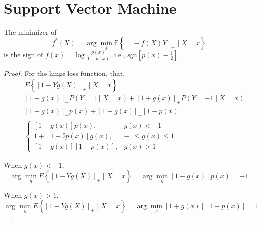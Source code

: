 \chapter{Support Vector Machine}

\begin{theorem}
    The minimizer of
    \begin{equation*}
        f^{*}(X)=\arg\min_{f}\mathbb{E}\left\{\left[1-f(X)Y\right]_{+}\mid X=x\right\}
    \end{equation*}
    is the sign of $f(x)=\log\frac{p(x)}{1-p(x)}$, i.e., $\text{sgn}\left[p(x)-\frac{1}{2}\right]$.
\end{theorem}

\begin{proof}
    For the hinge loss function, that,
    \begin{equation*}
        \begin{aligned}
              & E\left\{\left[1-Yg(X)\right]_{+}\mid X=x\right\}                                                   \\
            = & \left[1-g(x)\right]_{+}P\left(Y=1\mid X=x\right)+\left[1+g(x)\right]_{+}P\left(Y=-1\mid X=x\right) \\
            = & \left[1-g(x)\right]_{+}p(x)+\left[1+g(x)\right]_{+}\left[1-p(x)\right]                             \\
            = & \left\{\begin{array}{ll}
                \left[1-g(x)\right]p(x),                & g(x)<-1           \\
                1+\left[1-2p(x)\right]g(x),             & -1\leq g(x)\leq 1 \\
                \left[1+g(x)\right]\left[1-p(x)\right], & g(x)>1
            \end{array}\right.
        \end{aligned}
    \end{equation*}

    When $g(x)<-1$,
    \begin{equation*}
        \arg\min_{g}E\left\{\left[1-Yg(X)\right]_{+}\mid X=x\right\}=\arg\min_{g}\left[1-g(x)\right]p(x)=-1
    \end{equation*}

    When $g(x)>1$,
    \begin{equation*}
        \arg\min_{g}E\left\{\left[1-Yg(X)\right]_{+}\mid X=x\right\}=\arg\min_{g}\left[1+g(x)\right]\left[1-p(x)\right]=1
    \end{equation*}


\end{proof}
